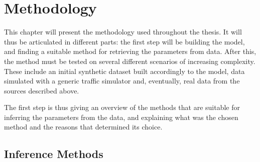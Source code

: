 \chapter{Methodology}
\label{chap:methodology}

This chapter will present the methodology used throughout the thesis.
It will thus be articulated in different parts:
the first step will be building the model,
and finding a suitable method for retrieving the parameters from data.
After this, the method must be tested on several different scenarios of increasing complexity.
These include an initial synthetic dataset built accordingly to the model,
data simulated with a generic traffic simulator and, eventually,
real data from the sources described above.

The first step is thus giving an overview of the methods that are suitable for inferring the parameters from the data,
and explaining what was the chosen method and the reasons that determined its choice.

\section{Inference Methods}
\label{sec:inference}



